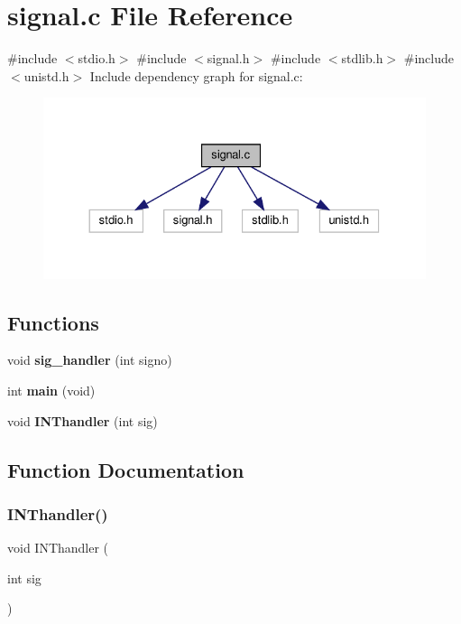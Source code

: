\section{signal.\+c File Reference}
\label{signal_8c}
{\ttfamily \#include $<$stdio.\+h$>$}\newline
{\ttfamily \#include $<$signal.\+h$>$}\newline
{\ttfamily \#include $<$stdlib.\+h$>$}\newline
{\ttfamily \#include $<$unistd.\+h$>$}\newline
Include dependency graph for signal.\+c\+:\nopagebreak
\begin{figure}[H]
\begin{center}
\leavevmode
\includegraphics[width=330pt]{signal_8c__incl}
\end{center}
\end{figure}
\subsection*{Functions}
\begin{DoxyCompactItemize}
\item 
void \textbf{ sig\+\_\+handler} (int signo)
\item 
int \textbf{ main} (void)
\item 
void \textbf{ I\+N\+Thandler} (int sig)
\end{DoxyCompactItemize}


\subsection{Function Documentation}
\mbox{\label{signal_8c_a6a3869251603ae4e569abadbd7dab11c}} 
\subsubsection{I\+N\+Thandler()}
{\footnotesize\ttfamily void I\+N\+Thandler (\begin{DoxyParamCaption}\item[{int}]{sig }\end{DoxyParamCaption})}

